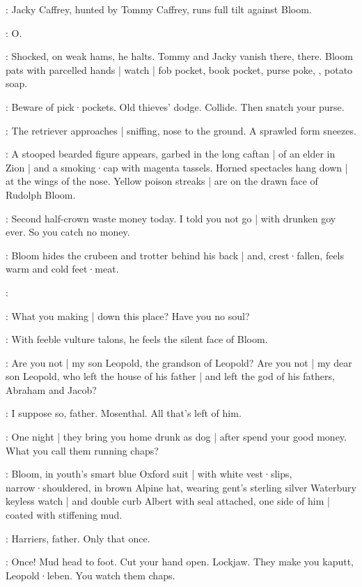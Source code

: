 :
Jacky Caffrey,
hunted by Tommy Caffrey,
runs full tilt against Bloom.

\Bloom:
O.

:
Shocked,
on weak hams,
he halts.
Tommy and Jacky vanish there,
there.
Bloom pats with parcelled hands |
watch |
fob pocket,
book pocket,
purse poke,
,
potato soap.

\Bloom:
Beware of pick·pockets.
Old thieves' dodge.
Collide.
Then snatch your purse.

:
The retriever approaches |
sniffing,
nose to the ground.
A sprawled form sneezes.

:
A stooped bearded figure appears,
garbed in the long caftan |
of an elder in Zion |
and a smoking·cap with magenta tassels.
Horned spectacles hang down |
at the wings of the nose.
Yellow poison streaks |
are on the drawn face of Rudolph Bloom.

\Rudolph:
Second half-crown waste money today.
I told you not go |
with drunken goy ever.
So you catch no money.

:
Bloom hides the crubeen and trotter behind his back |
and,
crest·fallen,
feels warm and cold feet·meat.

\Bloom:

\Rudolph:
What you making |
down this place?
Have you no soul?

:
With feeble vulture talons,
he feels the silent face of Bloom.

\Rudolph:
Are you not |
my son Leopold,
the grandson of Leopold?
Are you not |
my dear son Leopold,
who left the house of his father |
and left the god of his fathers,
Abraham and Jacob?

\Bloom:
I suppose so,
father.
Mosenthal.
All that's left of him.

\Rudolph:
One night |
they bring you home drunk as dog |
after spend your good money.
What you call them running chaps?

:
Bloom,
in youth's smart blue Oxford suit |
with white vest·slips,
narrow·shouldered,
in brown Alpine hat,
wearing gent's sterling silver Waterbury keyless watch |
and double curb Albert with seal attached,
one side of him |
coated with stiffening mud.

\Bloom:
Harriers,
father.
Only that once.

\Rudolph:
Once!
Mud head to foot.
Cut your hand open.
Lockjaw.
They make you kaputt,
Leopold·leben.
You watch them chaps.

